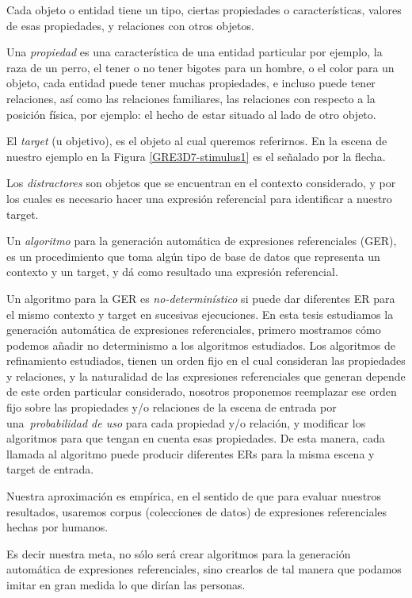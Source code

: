 Cada objeto o entidad tiene un tipo, ciertas propiedades o caracter\'isticas, valores de esas propiedades, y relaciones con otros objetos.

Una {\it propiedad} es una caracter\'istica de una entidad particular por ejemplo, la raza de un perro, el tener o no tener bigotes para un hombre, o el color para un objeto, cada entidad puede tener muchas propiedades, e incluso puede tener relaciones, as\'i como las relaciones familiares, las relaciones con respecto a la posici\'on f\'isica, por ejemplo: el hecho de estar situado al lado de otro objeto.

El \emph{target} (u objetivo), es el objeto al cual queremos referirnos. En la escena de nuestro ejemplo en la Figura \ref{GRE3D7-stimulus1} es el se\~nalado por la flecha.

Los \emph{distractores} son objetos que se encuentran en el contexto considerado, y por los cuales es necesario hacer una expresi\'on referencial para identificar a nuestro target. 

Un {\it algoritmo} para la generaci\'on autom\'atica de expresiones referenciales (GER), es un procedimiento que toma alg\'un tipo de base de datos que representa un contexto y un target, y d\'a como resultado una expresi\'on referencial.

Un algoritmo para la GER es \emph{no-determin\'istico} si puede dar diferentes ER para el mismo contexto y target en sucesivas ejecuciones.
En esta tesis estudiamos la generaci\'on autom\'atica de expresiones referenciales, 
primero mostramos c\'omo podemos a\~nadir no determinismo a los algoritmos estudiados. Los algoritmos de refinamiento estudiados, tienen un orden fijo en el cual consideran las propiedades y relaciones, y la naturalidad de las expresiones referenciales que generan depende de este orden particular considerado, nosotros proponemos reemplazar ese orden fijo sobre las propiedades y/o relaciones de la escena de entrada por una~\emph{probabilidad de uso} para cada propiedad y/o relaci\'on, y modificar los algoritmos para que tengan en cuenta esas propiedades. De esta manera, cada llamada al algoritmo puede producir diferentes ERs para la misma escena y target de entrada. 

Nuestra aproximaci\'on es emp\'irica, en el sentido de que para evaluar nuestros resultados, usaremos corpus (colecciones de datos) de expresiones referenciales hechas por humanos.

Es decir nuestra meta, no s\'olo ser\'a crear algoritmos para la generaci\'on autom\'atica de expresiones referenciales, sino crearlos de tal manera que podamos imitar en gran medida lo que dir\'ian las personas.

